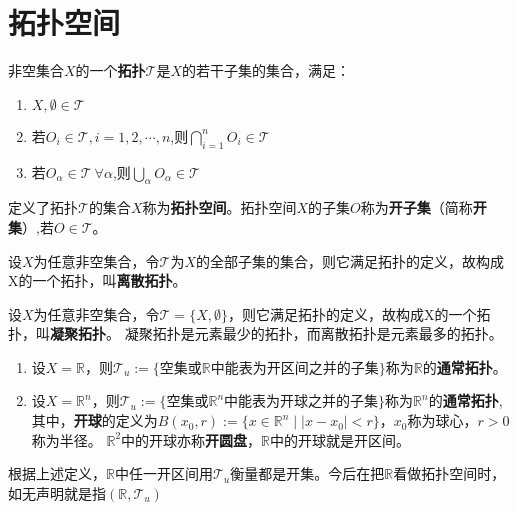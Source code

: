 \section{拓扑空间}

\begin{definition}
非空集合$X$的一个\textbf{拓扑}$\mathscr{T}$是$X$的若干子集的集合，满足：
\begin{enumerate}[（a）]
\item $X,\emptyset \in \mathscr{T}$
\item 若$O_i \in \mathscr{T}, i = 1, 2, \cdots, n$,则$\bigcap\limits^n_{i = 1}O_i \in \mathscr{T}$
\item 若$O_\alpha \in \mathscr{T} ~ \forall \alpha$,则$\bigcup\limits_{\alpha}O_\alpha \in \mathscr{T}$
\end{enumerate}
\end{definition}

\begin{definition}
定义了拓扑$\mathscr{T}$的集合$X$称为\textbf{拓扑空间}。拓扑空间$X$的子集$O$称为\textbf{开子集}（简称\textbf{开集}）,若$O \in \mathscr{T}$。
\end{definition}

\begin{example}
设$X$为任意非空集合，令$\mathscr{T}$为$X$的全部子集的集合，则它满足拓扑的定义，故构成X的一个拓扑，叫\textbf{离散拓扑}。
\end{example}

\begin{example}
设$X$为任意非空集合，令$\mathscr{T} = \{X, \emptyset\}$，则它满足拓扑的定义，故构成X的一个拓扑，叫\textbf{凝聚拓扑}。
凝聚拓扑是元素最少的拓扑，而离散拓扑是元素最多的拓扑。
\end{example}

\begin{example}
\begin{enumerate}[（1）]
\item 设$X = \mathbb{R}$，则$\mathscr{T}_u := \{\text{空集或}\mathbb{R}\text{中能表为开区间之并的子集}\}$称为$\mathbb{R}$的\textbf{通常拓扑}。
\item 设$X = \mathbb{R}^n$，则$\mathscr{T}_u := \{\text{空集或}\mathbb{R}^n\text{中能表为开球之并的子集}\}$称为$\mathbb{R}^n$的\textbf{通常拓扑},
其中，\textbf{开球}的定义为$B(x_0, r) := \{x \in \mathbb{R}^n \mid |x - x_0| < r\}$，$x_0$称为球心，$r > 0$称为半径。
$\mathbb{R}^2$中的开球亦称\textbf{开圆盘}，$\mathbb{R}$中的开球就是开区间。
\end{enumerate}
根据上述定义，$\mathbb{R}$中任一开区间用$\mathscr{T}_u$衡量都是开集。今后在把$\mathbb{R}$看做拓扑空间时，如无声明就是指$(\mathbb{R}, \mathscr{T}_u)$
\end{example}

